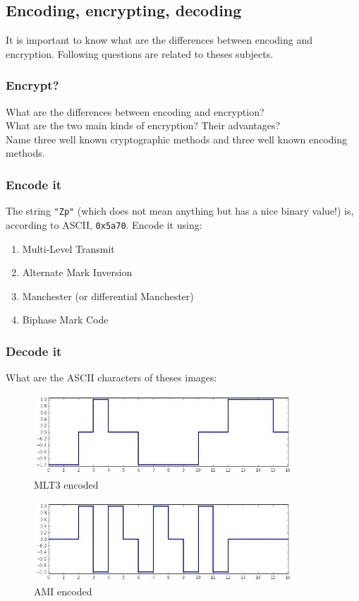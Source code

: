 \documentclass[11pt]{article}
\begin{document}
\subsection{Encoding, encrypting, decoding}
It is important to know what are the differences between encoding and encryption. Following questions are related to theses subjects.
\subsubsection{Encrypt?}
What are the differences between encoding and encryption?\\
What are the two main kinds of encryption? Their advantages?\\
Name three well known cryptographic methods and three well known encoding methods.

\subsubsection{Encode it}
The string \verb$"Zp"$ (which does not mean anything but has a nice binary value!) is, according to ASCII, \verb$0x5a70$. Encode it using:
  \begin{enumerate}
    \item Multi-Level Transmit
    \item Alternate Mark Inversion
    \item Manchester (or differential Manchester)
    \item Biphase Mark Code
  \end{enumerate}

\subsubsection{Decode it}
What are the ASCII characters of theses images:
  \begin{figure}[h]
    \centering
    \includegraphics[height=3cm]{../slides/imgs/MLT3:).jpg}
    \caption{MLT3 encoded}
    \label{fig:mlt3}
  \end{figure}
  \begin{figure}[h]
    \centering
    \includegraphics[height=3cm]{../slides/imgs/AMI;p.jpg}
    \caption{AMI encoded}
    \label{fig:ami}
  \end{figure}
\end{document}
